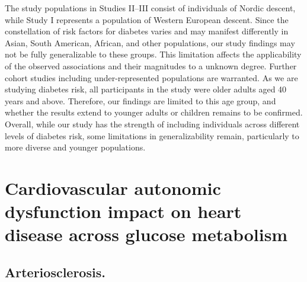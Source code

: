 \documentclass[
  a4paper,
  headsepline=true,
  open=any]{scrbook}
\begin{document}
The study populations in Studies II--III consist of individuals of
Nordic descent, while Study I represents a population of Western
European descent. Since the constellation of risk factors for diabetes
varies and may manifest differently in Asian, South American, African,
and other populations, our study findings may not be fully generalizable
to these groups. This limitation affects the applicability of the
observed associations and their magnitudes to a unknown degree. Further
cohort studies including under-represented populations are warranted. As
we are studying diabetes risk, all participants in the study were older
adults aged 40 years and above. Therefore, our findings are limited to
this age group, and whether the results extend to younger adults or
children remains to be confirmed. Overall, while our study has the
strength of including individuals across different levels of diabetes
risk, some limitations in generalizability remain, particularly to more
diverse and younger populations.


\hypertarget{cardiovascular-autonomic-dysfunction-impact-on-heart-disease-across-glucose-metabolism}{%
\chapter{Cardiovascular autonomic dysfunction impact on heart disease
across glucose
metabolism}\label{cardiovascular-autonomic-dysfunction-impact-on-heart-disease-across-glucose-metabolism}}

\hypertarget{arteriosclerosis.}{%
\section{Arteriosclerosis.}\label{arteriosclerosis.}}
\end{document}
